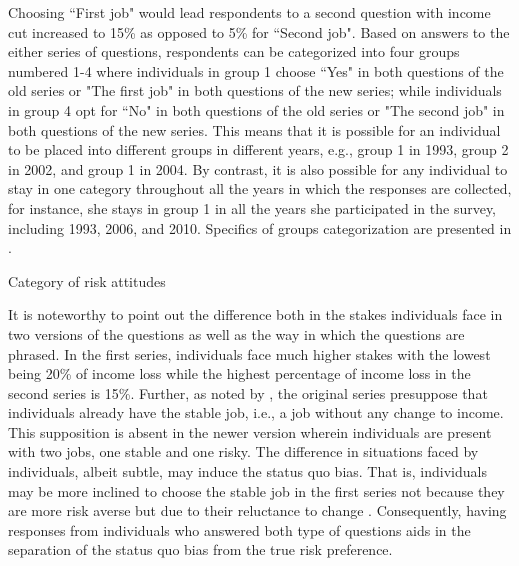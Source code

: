 \documentclass[]{article}
\begin{document}
Choosing ``First job" would lead respondents to a second question with income cut increased to 15\% as opposed to 5\% for ``Second job". Based on answers to the either series of questions, respondents can be categorized into four groups numbered 1-4 where individuals in group 1 choose ``Yes" in both questions of the old series or "The first job" in both questions of the new series; while individuals in group 4 opt for ``No" in both questions of the old series or "The second job" in both questions of the new series. This means that it is possible for an individual to be placed into different groups in different years, e.g., group 1 in 1993, group 2 in 2002, and group 1 in 2004. By contrast, it is also possible for any individual to stay in one category throughout all the years in which the responses are collected, for instance, she stays in group 1 in all the years she participated in the survey, including 1993, 2006, and 2010. Specifics of groups categorization are presented in . 

\begin{table}[!b]
	\centering
	\setlength{\extrarowheight}{0.2em}
	\caption{Category of risk attitudes}	
	
	\label{table:risk-category}
\end{table}

It is noteworthy to point out the difference both in the stakes individuals face in two versions of the questions as well as the way in which the questions are phrased. In the first series, individuals face much higher stakes with the lowest being 20\% of income loss while the highest percentage of income loss in the second series is 15\%. Further, as noted by \citet{kimball2008imputing,kimball2009risk}, the original series presuppose that individuals already have the stable job, i.e., a job without any change to income. This supposition is absent in the newer version wherein individuals are present with two jobs, one stable and one risky. The difference in situations faced by individuals, albeit subtle, may induce the status quo bias. That is, individuals may be more inclined to choose the stable job in the first series not because they are more risk averse but due to their reluctance to change \citep{samuelson1988status,tversky1991loss}. Consequently, having responses from individuals who answered both type of questions aids in the separation of the status quo bias from the true risk preference.
\end{document}
